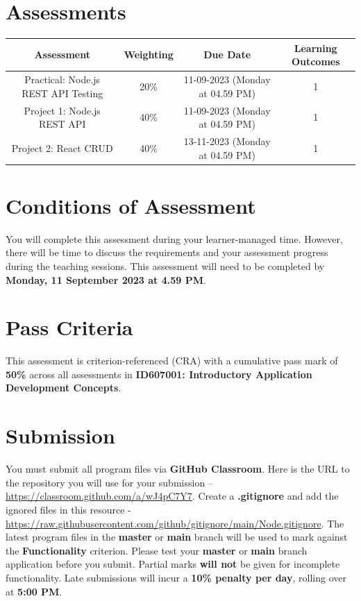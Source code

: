 \documentclass{article}
\begin{document}
\section*{Assessments}
\renewcommand{\arraystretch}{1.5}
\begin{tabular}{|c|c|c|c|}
	\hline
	\textbf{Assessment}                                 & \textbf{Weighting} & \textbf{Due Date}            & \textbf{Learning Outcomes} \\ \hline
	\small Practical: Node.js REST API Testing & \small 20\%        & \small 11-09-2023 (Monday at 04.59 PM)   & \small 1                   \\ \hline
	\small Project 1: Node.js REST API                  & \small 40\%        & \small \small 11-09-2023 (Monday at 04.59 PM) & \small 1                   \\ \hline
	\small Project 2: React CRUD                        & \small 40\%        & \small 13-11-2023 (Monday at 04.59 PM)  & \small 1                   \\ \hline
\end{tabular}

\section*{Conditions of Assessment}
You will complete this assessment during your learner-managed time. However, there will be time to discuss the requirements and your assessment progress during the teaching sessions. This assessment will need to be completed by \textbf{Monday, 11 September 2023 at 4.59 PM}.

\section*{Pass Criteria}
This assessment is criterion-referenced (CRA) with a cumulative pass mark of \textbf{50\%} across all assessments in \textbf{ID607001: Introductory Application Development Concepts}.

\section*{Submission}
You must submit all program files via \textbf{GitHub Classroom}. Here is the URL to the repository you will use for your submission – \href{https://classroom.github.com/a/wJ4pC7Y7}{https://classroom.github.com/a/wJ4pC7Y7}. Create a \textbf{.gitignore} and add the ignored files in this resource - \href{https://raw.githubusercontent.com/github/gitignore/main/Node.gitignore}{https://raw.githubusercontent.com/github/gitignore/main/Node.gitignore}. The latest program files in the \textbf{master} or \textbf{main} branch will be used to mark against the \textbf{Functionality} criterion. Please test your \textbf{master} or \textbf{main} branch application before you submit. Partial marks \textbf{will not} be given for incomplete functionality. Late submissions will incur a \textbf{10\% penalty per day}, rolling over at \textbf{5:00 PM}.
\end{document}
